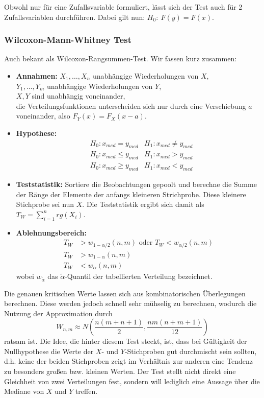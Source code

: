 Obwohl nur für eine Zufallsvariable formuliert, lässt sich der Test auch für 2 
Zufallsvariablen durchführen. Dabei gilt nun: \(H_0:\ F(y) = F(x)\).

\subsubsection{Wilcoxon-Mann-Whitney Test}
Auch bekant als Wilcoxon-Rangsummen-Test. Wir fassen kurz zusammen:
\begin{itemize}
	\item \textbf{Annahmen:} \(X_1,\dots,X_n\) unabhängige Wiederholungen von \(X\),\\
				\(Y_1,\dots,Y_m\) unabhängige Wiederholungen von \(Y\),\\
				\(X,Y\) sind unabhängig voneinander,\\
				die Verteilungsfunktionen unterscheiden sich nur durch eine Verschiebung \(a\) voneinander, also \(F_Y(x) = F_X(x-a)\). 
	\item \textbf{Hypothese:} \begin{align}
					&H_0: x_{med}=y_{med} 	&H_1: x_{med}\neq y_{med} \tag{a}\\
					&H_0: x_{med}\leq y_{med} &H_1: x_{med} > y_{med} \tag{b}\\
					&H_0: x_{med}\geq y_{med} &H_1: x_{med} < y_{med} \tag{c}
				\end{align}
	\item \textbf{Teststatistik:} Sortiere die Beobachtungen gepoolt und berechne die Summe der Ränge der
	Elemente der anfangs kleineren Strichprobe. Diese kleinere Stichprobe sei nun \(X\). Die Teststatistik ergibt sich damit als
	\(T_W = \sum\limits_{i=1}^n rg(X_i)\).
	\item \textbf{Ablehnungsbereich:} \begin{align}
						T_W &> w_{1-\alpha /2}(n,m) \text{ oder } T_W < w_{\alpha /2}(n,m) \tag{a}\\
						T_W &> w_{1-\alpha}(n,m) \tag{b}\\
						T_W &< w_{\alpha}(n,m) \tag{c}
					\end{align}
					wobei \(w_{\tilde{\alpha}}\) das \(\tilde{\alpha}\)-Quantil der tabellierten Verteilung bezeichnet.
\end{itemize}
Die genauen kritischen Werte lassen sich aus kombinatorischen Überlegungen 
berechnen. Diese werden jedoch schnell sehr mühselig zu berechnen, wodurch 
die Nutzung der Approximation durch
\[
	W_{n,m} \approx N \left( \frac{n(m+n+1)}{2}, \frac{nm(n+m+1)}{12} \right)
\]
ratsam ist. Die Idee, die hinter diesem Test steckt, ist, dass bei Gültigkeit
der Nullhypothese die Werte der \(X\)- und \(Y\)-Stichproben gut durchmischt
sein sollten, d.h. keine der beiden Stichproben zeigt im Verhältnis zur anderen
eine Tendenz zu besonders großen bzw. kleinen Werten. Der Test stellt nicht direkt
eine Gleichheit von zwei Verteilungen fest, sondern will lediglich eine Aussage über
die Mediane von \(X\) und \(Y\) treffen.

